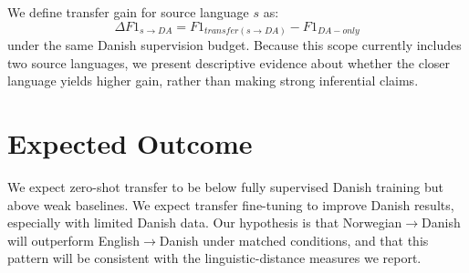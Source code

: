 \documentclass[11pt]{article}
\begin{document}
We define transfer gain for source language $s$ as:
\[
\Delta F1_{s\rightarrow DA} = F1_{transfer(s\rightarrow DA)} - F1_{DA-only}
\]
under the same Danish supervision budget. Because this scope currently includes two source languages, we present descriptive evidence about whether the closer language yields higher gain, rather than making strong inferential claims.

\section{Expected Outcome}
We expect zero-shot transfer to be below fully supervised Danish training but above weak baselines. We expect transfer fine-tuning to improve Danish results, especially with limited Danish data. Our hypothesis is that Norwegian$\rightarrow$Danish will outperform English$\rightarrow$Danish under matched conditions, and that this pattern will be consistent with the linguistic-distance measures we report.


\end{document}
